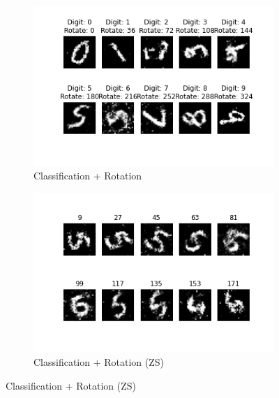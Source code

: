 \documentclass[11pt, letterpaper, oneside]{article}
\begin{document}
\begin{figure}
    \begin{subfigure}{.5\textwidth}
      \centering
      \includegraphics[width=1\linewidth]{digit_rotate.png}  
      \caption{Classification + Rotation}
      \label{fig:sub-first}
    \end{subfigure}
    \begin{subfigure}{.5\textwidth}
      \centering
      \includegraphics[width=1\linewidth]{rotation_ZSL.png}  
      \caption{Classification + Rotation (ZS)}
      \label{fig:sub-second}
    \end{subfigure}



\end{figure}
\end{document}
